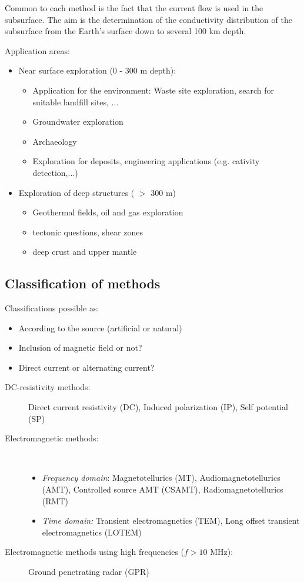 Common to each method is the fact that the current flow is used in the subsurface. The aim is the determination of the conductivity distribution of the subsurface from the Earth's surface down to several 100 km depth.

Application areas:
\begin{itemize}
\item Near surface exploration (0 - 300 m depth): 
\begin{itemize}
\item Application for the environment: Waste site exploration, search for suitable landfill sites, ...
\item Groundwater exploration
\item Archaeology
\item Exploration for deposits, engineering applications (e.g. cativity detection,...)
\end{itemize}
\item Exploration of deep structures ( $>$ 300 m)
\begin{itemize}
\item Geothermal fields, oil and gas exploration
\item tectonic questions, shear zones
\item deep crust and upper mantle
\end{itemize}


\end{itemize}
\subsection{Classification of methods}
Classifications possible as:
\begin{itemize}
\item According to the source (artificial or natural)
\item Inclusion of magnetic field or not?
\item Direct current or alternating current?
\end{itemize}
\begin{description}
\item[DC-resistivity methods:] Direct current resistivity (DC), Induced polarization (IP), Self potential (SP)
\item[Electromagnetic methods:] ~\\
\begin{itemize}
\item \textit{Frequency domain}: Magnetotellurics (MT), Audiomagnetotellurics (AMT), Controlled source AMT (CSAMT), Radiomagnetotellurics (RMT)
\item \textit{Time domain:} Transient electromagnetics (TEM), Long offset transient electromagnetics (LOTEM)
\end{itemize}
\item[Electromagnetic methods using high frequencies ($f > 10$ MHz):] Ground penetrating radar (GPR)
\end{description}
